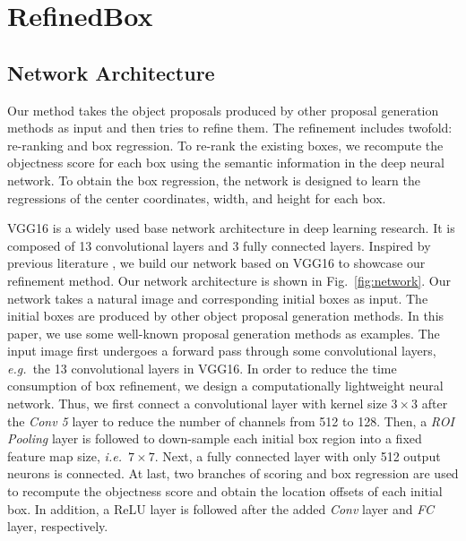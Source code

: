 \documentclass[letterpaper]{article} %
\newcommand{\figref}[1]{Fig.~\ref{#1}}
\def\ie{\emph{i.e.~}}
\def\eg{\emph{e.g.~}}
\begin{document}
\section{RefinedBox}
%
\subsection{Network Architecture}
%
Our method takes the object proposals produced by other proposal generation methods
as input and then tries to refine them.
The refinement includes twofold: re-ranking and box regression.
To re-rank the existing boxes, we recompute the objectness score for each box
using the semantic information in the deep neural network.
To obtain the box regression, the network is designed to learn the regressions
of the center coordinates, width, and height for each box.


VGG16 \cite{simonyan2014very} is a widely used base network architecture
in deep learning research.
It is composed of 13 convolutional layers and 3 fully connected layers.
Inspired by previous literature \cite{girshick2015fast,ren2015faster},
we build our network based on VGG16 to showcase our refinement method.
Our network architecture is shown in \figref{fig:network}.
Our network takes a natural image and corresponding initial boxes as input.
The initial boxes are produced by other object proposal generation methods.
In this paper, we use some well-known proposal generation methods as examples.
The input image first undergoes a forward pass through some convolutional layers,
\eg the 13 convolutional layers in VGG16.
In order to reduce the time consumption of box refinement,
we design a computationally lightweight neural network.
Thus, we first connect a convolutional layer with kernel size $3 \times 3$ after
the \textit{Conv 5} layer to reduce the number of channels from 512 to 128.
Then, a \textit{ROI Pooling} layer is followed to down-sample each initial box region
into a fixed feature map size, \ie $7 \times 7$.
Next, a fully connected layer with only 512 output neurons is connected.
At last, two branches of scoring and box regression are used to recompute the
objectness score and obtain the location offsets of each initial box.
In addition, a ReLU layer is followed after the added \textit{Conv} layer
and \textit{FC} layer, respectively.
\end{document}
